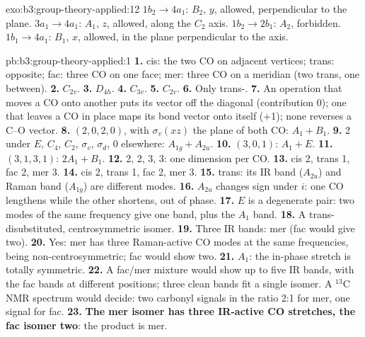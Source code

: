 \begin{solution}{exo:b3:group-theory-applied:12}
$1b_2 \to 4a_1$: $B_2$, $y$, allowed, perpendicular to the plane. $3a_1 \to 4a_1$:
$A_1$, $z$, allowed, along the $C_2$ axis. $1b_2 \to 2b_1$: $A_2$, forbidden.
$1b_1 \to 4a_1$: $B_1$, $x$, allowed, in the plane perpendicular to the axis.
\end{solution}

\begin{solution}{pb:b3:group-theory-applied:1}
\textbf{1.} cis: the two CO on adjacent vertices; trans: opposite; fac: three
CO on one face; mer: three CO on a meridian (two trans, one between).
\textbf{2.} $C_{2v}$.
\textbf{3.} $D_{4h}$.
\textbf{4.} $C_{3v}$.
\textbf{5.} $C_{2v}$.
\textbf{6.} Only trans-.
\textbf{7.} An operation that moves a CO onto another puts its vector off the
diagonal (contribution 0); one that leaves a CO in place maps its bond vector
onto itself (+1); none reverses a C--O vector.
\textbf{8.}  $(2, 0, 2, 0)$, with $\sigma_v(xz)$ the plane of both CO: $A_1 +
B_1$.
\textbf{9.}  2 under $E$, $C_4$, $C_2$, $\sigma_v$, $\sigma_d$, 0 elsewhere:
$A_{1g} + A_{2u}$.
\textbf{10.} $(3, 0, 1)$: $A_1 + E$.
\textbf{11.} $(3, 1, 3, 1)$: $2A_1 + B_1$.
\textbf{12.} 2, 2, 3, 3: one dimension per CO.
\textbf{13.} cis 2, trans 1, fac 2, mer 3.
\textbf{14.} cis 2, trans 1, fac 2, mer 3.
\textbf{15.} trans: its IR band ($A_{2u}$) and Raman band ($A_{1g}$) are different
modes.
\textbf{16.} $A_{2u}$ changes sign under $i$: one CO lengthens while the other
shortens, out of phase.
\textbf{17.} $E$ is a degenerate pair: two modes of the same frequency give one
band, plus the $A_1$ band.
\textbf{18.} A trans-disubstituted, centrosymmetric isomer.
\textbf{19.} Three IR bands: mer (fac would give two).
\textbf{20.} Yes: mer has three Raman-active CO modes at the same frequencies,
being non-centrosymmetric; fac would show two.
\textbf{21.} $A_1$: the in-phase stretch is totally symmetric.
\textbf{22.} A fac/mer mixture would show up to five IR bands, with the fac
bands at different positions; three clean bands fit a single isomer. A
${}^{13}$C NMR spectrum would decide: two carbonyl signals in the ratio 2:1 for
mer, one signal for fac.
\textbf{23.} \textbf{The mer isomer has three IR-active CO stretches, the fac
isomer two}: the product is mer.
\end{solution}
